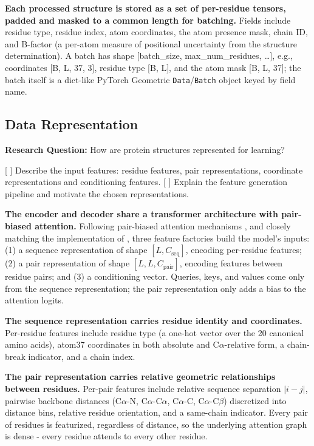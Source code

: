 \textbf{Each processed structure is stored as a set of per-residue tensors, padded and masked
to a common length for batching.} Fields include residue type, residue index, atom
coordinates, the atom presence mask, chain ID, and B-factor (a per-atom measure of positional
uncertainty from the structure determination). A batch has shape
[batch\_size, max\_num\_residues, \dots], e.g., coordinates [B, L, 37, 3], residue type
[B, L], and the atom mask [B, L, 37]; the batch itself is a dict-like PyTorch Geometric
\texttt{Data}/\texttt{Batch} object keyed by field name.


\subsection{Data Representation}
\textbf{Research Question:} How are protein structures represented for learning?

[ ] Describe the input features: residue features, pair representations, coordinate representations and conditioning features.
[ ] Explain the feature generation pipeline and motivate the chosen representations.

\textbf{The encoder and decoder share a transformer architecture with pair-biased
attention.} Following pair-biased attention mechanisms
\citep{jumper2021,abramson2024}, and closely matching the implementation of
\citep{geffner2025}, three feature factories build the model's inputs: (1) a sequence
representation of shape $[L, C_{\text{seq}}]$, encoding per-residue features; (2) a pair
representation of shape $[L, L, C_{\text{pair}}]$, encoding features between residue pairs;
and (3) a conditioning vector. Queries, keys, and values come only from the
sequence representation; the pair representation only adds a bias to the attention logits.

\textbf{The sequence representation carries residue identity and coordinates.}
Per-residue features include residue type (a one-hot vector over the 20 canonical
amino acids), atom37 coordinates in both absolute and C$\alpha$-relative form, a chain-break
indicator, and a chain index.

\textbf{The pair representation carries relative geometric relationships between residues.}
Per-pair features include relative sequence separation $|i-j|$, pairwise backbone
distances (C$\alpha$-N, C$\alpha$-C$\alpha$, C$\alpha$-C, C$\alpha$-C$\beta$) discretized
into distance bins, relative residue orientation, and a same-chain indicator. Every pair of
residues is featurized, regardless of distance, so the underlying attention graph is dense - every residue attends to every other residue.

